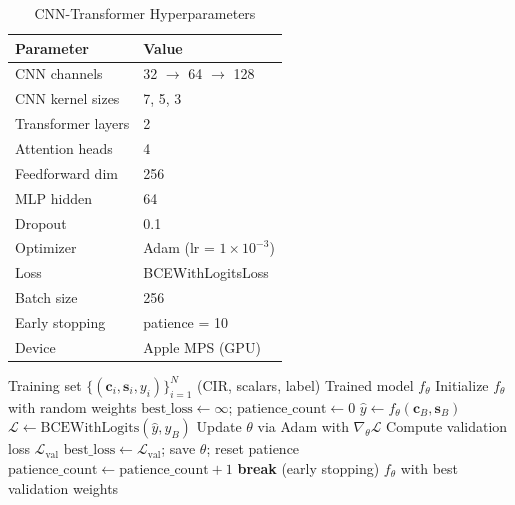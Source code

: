 \documentclass[conference]{IEEEtran}
\begin{document}
\begin{table}[t]
\caption{CNN-Transformer Hyperparameters}
\label{tab:hyperparams}
\centering
\begin{tabular}{@{}ll@{}}
\toprule
\textbf{Parameter} & \textbf{Value} \\
\midrule
CNN channels & 32 $\rightarrow$ 64 $\rightarrow$ 128 \\
CNN kernel sizes & 7, 5, 3 \\
Transformer layers & 2 \\
Attention heads & 4 \\
Feedforward dim & 256 \\
MLP hidden & 64 \\
Dropout & 0.1 \\
Optimizer & Adam (lr = $1 \times 10^{-3}$) \\
Loss & BCEWithLogitsLoss \\
Batch size & 256 \\
Early stopping & patience = 10 \\
Device & Apple MPS (GPU) \\
\bottomrule
\end{tabular}
\end{table}

\begin{algorithm}[t]
\caption{CNN-Transformer Training}
\label{alg:training}
\begin{algorithmic}[1]
\REQUIRE Training set $\{(\mathbf{c}_i, \mathbf{s}_i, y_i)\}_{i=1}^{N}$ (CIR, scalars, label)
\ENSURE Trained model $f_\theta$
\STATE Initialize $f_\theta$ with random weights
\STATE $\text{best\_loss} \leftarrow \infty$; $\text{patience\_count} \leftarrow 0$
        \STATE $\hat{y} \leftarrow f_\theta(\mathbf{c}_B, \mathbf{s}_B)$
        \STATE $\mathcal{L} \leftarrow \text{BCEWithLogits}(\hat{y}, y_B)$
        \STATE Update $\theta$ via Adam with $\nabla_\theta \mathcal{L}$
    \ENDFOR
    \STATE Compute validation loss $\mathcal{L}_\text{val}$
        \STATE $\text{best\_loss} \leftarrow \mathcal{L}_\text{val}$; save $\theta$; reset patience
    \ELSE
        \STATE $\text{patience\_count} \leftarrow \text{patience\_count} + 1$
    \ENDIF
        \STATE \textbf{break} (early stopping)
    \ENDIF
\ENDFOR
\RETURN $f_\theta$ with best validation weights
\end{algorithmic}
\end{algorithm}
\end{document}

